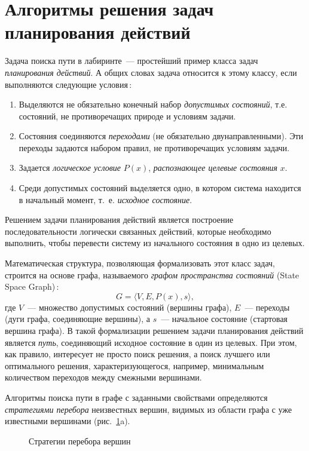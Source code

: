\documentclass[a4paper,14pt, openany, twoside, draft]{extbook} %
\begin{document}
\section{Алгоритмы решения задач планирования действий}
\label{sec:problemsolving}

Задача поиска пути в лабиринте~--- простейший пример класса задач \emph{планирования действий}.  А общих словах задача относится к этому классу, если выполняются следующие условия\,:
\begin{enumerate}
\item Выделяются не обязательно конечный набор \emph{допустимых состояний}, т.е. состояний, не противоречащих природе и условиям задачи.
\item Состояния соединяются \emph{переходами} (не обязательно двунаправленными). Эти переходы задаются набором правил, не противоречащих условиям задачи.
\item Задается \emph{логическое условие} $P(x)$, \emph{распознающее целевые состояния} $x$.
\item Среди допустимых состояний выделяется одно, в котором система находится в начальный момент, т.~е. \emph{исходное состояние}.
\end{enumerate}
Решением задачи планирования действий является построение последовательности логически связанных действий, которые необходимо выполнить, чтобы перевести систему из начального состояния в одно из целевых.

Математическая структура, позволяющая формализовать этот класс задач, строится на основе графа, называемого \emph{графом пространства состояний} (\foreignlanguage{english}{State Space Graph})\,:
$$
G=\langle V,E, P(x), s\rangle,
$$
где $V$~--- множество допустимых состояний (вершины графа), $E$~--- переходы (дуги графа, соединяющие вершины), а $s$~--- начальное состояние (стартовая вершина графа).  В такой формализации решением задачи планирования действий является \emph{путь}, соединяющий исходное состояние в один из целевых.  При этом, как правило, интересует не просто поиск решения, а поиск лучшего или оптимального решения, характеризующегося, например, минимальным количеством переходов между смежными вершинами.

Алгоритмы поиска пути в графе с заданными свойствами определяются \emph{стратегиями перебора} неизвестных вершин, видимых из области графа с уже известными вершинами (рис.~\ref{fig:searchdescr}a).
\begin{figure}[hbtp]
  \centering
  \def\svgwidth{\columnwidth}
  \footnotesize\itshape
  \def\zb{\normalsize $D$}
  \def\ya{\footnotesize\it a)}
  \def\yb{\footnotesize\it b)}
  \def\yc{\footnotesize\it c)}
  
  \caption{Стратегии перебора вершин}
  \label{fig:searchdescr}
\end{figure}
\end{document}

